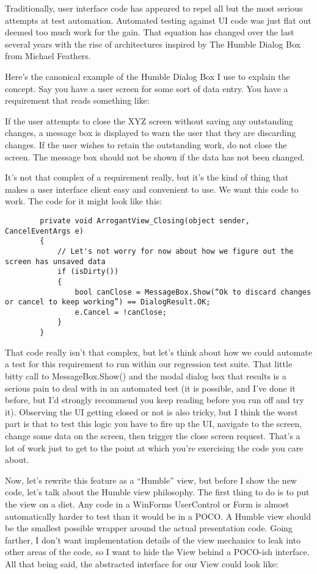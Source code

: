 \documentclass{article}
\begin{document}
{Traditionally, user interface code has appeared to repel all but the most serious attempts at test automation.  Automated testing against UI code was just flat out deemed too much work for the gain.  That equation has changed over the last several years with the rise of architectures inspired by The Humble Dialog Box from Michael Feathers. 

Here's the canonical example of the Humble Dialog Box I use to explain the concept.  Say you have a user screen for some sort of data entry.  You have a requirement that reads something like:

    If the user attempts to close the XYZ screen without saving any outstanding changes, a message box is displayed to warn the user that they are discarding changes.  If the user wishes to retain the outstanding work, do not close the screen.  The message box should not be shown if the data has not been changed.

It's not that complex of a requirement really, but it's the kind of thing that makes a user interface client easy and convenient to use.  We want this code to work.  The code for it might look like this:

\begin{lstlisting}
        private void ArrogantView_Closing(object sender, CancelEventArgs e)
        {
            // Let's not worry for now about how we figure out the screen has unsaved data
            if (isDirty())
            {
                bool canClose = MessageBox.Show(“Ok to discard changes or cancel to keep working”) == DialogResult.OK;
                e.Cancel = !canClose;
            }
        }
\end{lstlisting}

That code really isn't that complex, but let's think about how we could automate a test for this requirement to run within our regression test suite.  That little bitty call to MessageBox.Show() and the modal dialog box that results is a serious pain to deal with in an automated test (it is possible, and I've done it before, but I'd strongly recommend you keep reading before you run off and try it).  Observing the UI getting closed or not is also tricky, but I think the worst part is that to test this logic you have to fire up the UI, navigate to the screen, change some data on the screen, then trigger the close screen request.  That's a lot of work just to get to the point at which you're exercising the code you care about.

Now, let's rewrite this feature as a “Humble” view, but before I show the new code, let's talk about the Humble view philosophy.  The first thing to do is to put the view on a diet.  Any code in a WinForms UserControl or Form is almost automatically harder to test than it would be in a POCO.  A Humble view should be the smallest possible wrapper around the actual presentation code.  Going farther, I don't want implementation details of the view mechanics to leak into other areas of the code, so I want to hide the View behind a POCO-ish interface.  All that being said, the abstracted interface for our View could look like:

}
\end{document}
